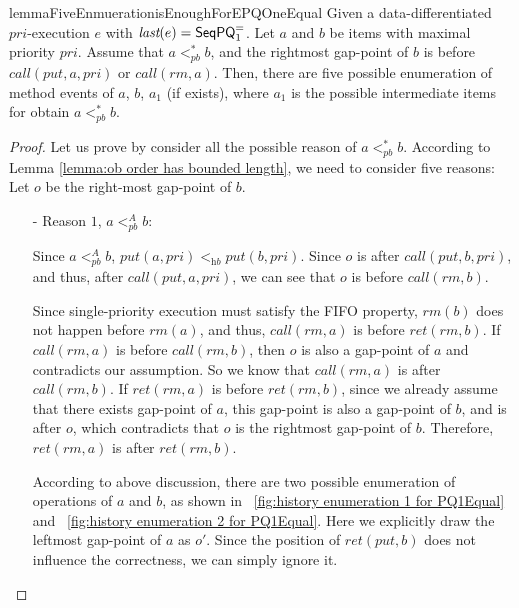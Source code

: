 \begin{restatable}{lemma}{FiveEnmuerationisEnoughForEPQOneEqual}
\label{lemma:five enumeration is enough for EPQ1Equal}
Given a data-differentiated $\textit{pri}$-execution $e$ with $\textit{last}(e) = \mathsf{SeqPQ}_1^{=}$. Let $a$ and $b$ be items with maximal priority $\textit{pri}$. Assume that $a <_{\textit{pb}}^* b$, and the rightmost gap-point of $b$ is before $\textit{call}(\textit{put},a,\textit{pri})$ or $\textit{call}(\textit{rm},a)$. Then, there are five possible enumeration of method events of $a$, $b$, $a_1$ (if exists), where $a_1$ is the possible intermediate items for obtain $a <_{\textit{pb}}^* b$.
\end{restatable}
\begin {proof}

Let us prove by consider all the possible reason of $a <_{\textit{pb}}^* b$. According to Lemma \ref{lemma:ob order has bounded length}, we need to consider five reasons: Let $o$ be the right-most gap-point of $b$.

\begin{itemize}
\setlength{\itemsep}{0.5pt}
\item[-] Reason $1$, $a <_{\textit{pb}}^A b$:

    Since $a <_{\textit{pb}}^A b$, $\textit{put}(a,\textit{pri}) <_{\textit{hb}} \textit{put}(b,\textit{pri})$. Since $o$ is after $\textit{call}(\textit{put},b,\textit{pri})$, and thus, after $\textit{call}(\textit{put},a,\textit{pri})$, we can see that $o$ is before $\textit{call}(\textit{rm},b)$.

    Since single-priority execution must satisfy the FIFO property, $\textit{rm}(b)$ does not happen before $\textit{rm}(a)$, and thus, $\textit{call}(\textit{rm},a)$ is before $\textit{ret}(\textit{rm},b)$. If $\textit{call}(\textit{rm},a)$ is before $\textit{call}(\textit{rm},b)$, then $o$ is also a gap-point of $a$ and contradicts our assumption. So we know that $\textit{call}(\textit{rm},a)$ is after $\textit{call}(\textit{rm},b)$. If $\textit{ret}(\textit{rm},a)$ is before $\textit{ret}(\textit{rm},b)$, since we already assume that there exists gap-point of $a$, this gap-point is also a gap-point of $b$, and is after $o$, which contradicts that $o$ is the rightmost gap-point of $b$. Therefore, $\textit{ret}(\textit{rm},a)$ is after $\textit{ret}(\textit{rm},b)$.

    According to above discussion, there are two possible enumeration of operations of $a$ and $b$, as shown in \figurename~\ref{fig:history enumeration 1 for PQ1Equal} and \figurename~\ref{fig:history enumeration 2 for PQ1Equal}. Here we explicitly draw the leftmost gap-point of $a$ as $o'$. Since the position of $\textit{ret}(\textit{put},b)$ does not influence the correctness, we can simply ignore it.


\end{itemize}
\end{proof}
